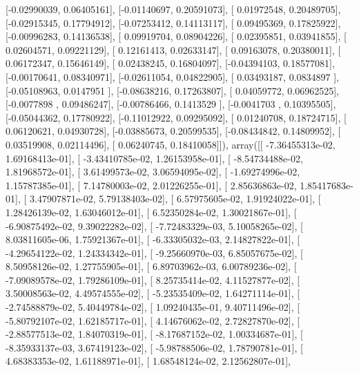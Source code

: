 \documentclass{article}
\begin{document}
       [-0.02990039,  0.06405161],
       [-0.01140697,  0.20591073],
       [ 0.01972548,  0.20489705],
       [-0.02915345,  0.17794912],
       [-0.07253412,  0.14113117],
       [ 0.09495369,  0.17825922],
       [-0.00996283,  0.14136538],
       [ 0.09919704,  0.08904226],
       [ 0.02395851,  0.03941855],
       [ 0.02604571,  0.09221129],
       [ 0.12161413,  0.02633147],
       [ 0.09163078,  0.20380011],
       [ 0.06172347,  0.15646149],
       [ 0.02438245,  0.16804097],
       [-0.04394103,  0.18577081],
       [-0.00170641,  0.08340971],
       [-0.02611054,  0.04822905],
       [ 0.03493187,  0.0834897 ],
       [-0.05108963,  0.0147951 ],
       [-0.08638216,  0.17263807],
       [ 0.04059772,  0.06962525],
       [-0.0077898 ,  0.09486247],
       [-0.00786466,  0.1413529 ],
       [-0.0041703 ,  0.10395505],
       [-0.05044362,  0.17780922],
       [-0.11012922,  0.09295092],
       [ 0.01240708,  0.18724715],
       [ 0.06120621,  0.04930728],
       [-0.03885673,  0.20599535],
       [-0.08434842,  0.14809952],
       [ 0.03519908,  0.02114496],
       [ 0.06240745,  0.18410058]]), array([[ -7.36455313e-02,   1.69168413e-01],
       [ -3.43410785e-02,   1.26153958e-01],
       [ -8.54734488e-02,   1.81968572e-01],
       [  3.61499573e-02,   3.06594095e-02],
       [ -1.69274996e-02,   1.15787385e-01],
       [  7.14780003e-02,   2.01226255e-01],
       [  2.85636863e-02,   1.85417683e-01],
       [  3.47907871e-02,   5.79138403e-02],
       [  6.57975605e-02,   1.91924022e-01],
       [  1.28426139e-02,   1.63046012e-01],
       [  6.52350284e-02,   1.30021867e-01],
       [ -6.90875492e-02,   9.39022282e-02],
       [ -7.72483329e-03,   5.10058265e-02],
       [  8.03811605e-06,   1.75921367e-01],
       [ -6.33305032e-03,   2.14827822e-01],
       [ -4.29654122e-02,   1.24334342e-01],
       [ -9.25660970e-03,   6.85057675e-02],
       [  8.50958126e-02,   1.27755905e-01],
       [  6.89703962e-03,   6.00789236e-02],
       [ -7.09089578e-02,   1.79286109e-01],
       [  8.25735414e-02,   4.11527877e-02],
       [  3.50008563e-02,   4.49574555e-02],
       [ -5.23535409e-02,   1.64271114e-01],
       [ -2.74588879e-02,   5.40449784e-02],
       [  1.09240435e-01,   9.40711496e-02],
       [ -5.80792107e-02,   1.62185717e-01],
       [  4.14676062e-02,   2.72827870e-02],
       [ -2.88577513e-02,   1.84070319e-01],
       [ -8.17687152e-02,   1.00334687e-01],
       [ -8.35933137e-03,   3.67419123e-02],
       [ -5.98788506e-02,   1.78790781e-01],
       [  4.68383353e-02,   1.61188971e-01],
       [  1.68548124e-02,   2.12562807e-01],
\end{document}
